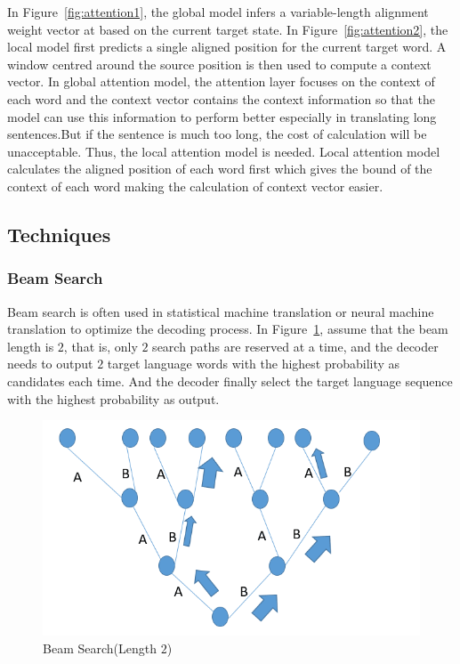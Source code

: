 \documentclass[a4paper, 12pt]{article}
\begin{document}
In Figure~\ref{fig:attention1}, the global model infers a variable-length alignment weight vector at based on the current target state. In Figure~\ref{fig:attention2}, the local model first predicts a single aligned position for the current target word. A window centred around the source position is then used to compute a context vector. In global attention model, the attention layer focuses on the context of each word and the context vector contains the context information so that the model can use this information to perform better especially in translating long sentences.But if the sentence is much too long, the cost of calculation will be unacceptable. Thus, the local attention model is needed. Local attention model calculates the aligned position of each word first which gives the bound of the context of each word making the calculation of context vector easier.

\subsection{Techniques}
\subsubsection{Beam Search}
Beam search\cite{papineni2002bleu} is often used in statistical machine translation or neural machine translation to optimize the decoding process. In Figure~\ref{fig:beam}, assume that the beam length is $2$, that is, only $2$ search paths are reserved at a time, and the decoder needs to output $2$ target language words with the highest probability as candidates each time. And the decoder finally select the target language sequence with the highest probability as output.

\begin{figure}[H]
\centering
\includegraphics[scale=0.5]{beamsearch.png}
\caption{\label{fig:beam}Beam Search(Length $2$)}
\end{figure}
\end{document}
